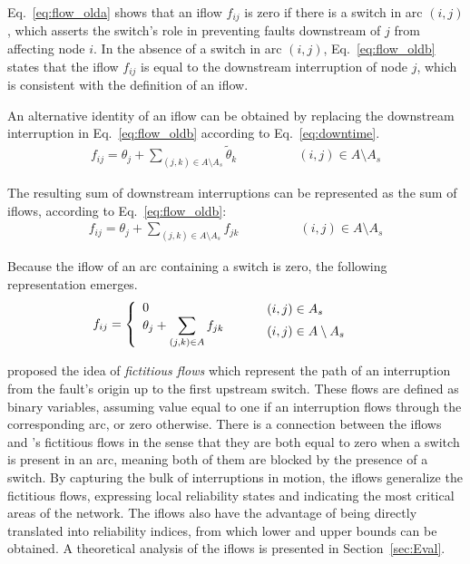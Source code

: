 Eq.~\eqref{eq:flow_olda} shows that an iflow $f_{ij}$ is zero if there is a switch in arc $(i,j)$, which asserts the switch's role in preventing faults downstream of $j$ from affecting node $i$. In the absence of a switch in arc $(i,j)$, Eq.~\eqref{eq:flow_oldb} states that the iflow $f_{ij}$ is equal to the downstream interruption of node $j$, which is consistent with the definition of an iflow.

An alternative identity of an iflow can be obtained by replacing the downstream interruption in Eq.~\eqref{eq:flow_oldb} according to Eq.~\eqref{eq:downtime}.
\begin{align*} 
\displaystyle
f_{ij} =
		\displaystyle \theta_{j} + \sum_{(j,k) \in A \setminus A_{s}}{\tilde{\theta}_{k}}  \qquad \qquad & (i,j) \in A \setminus A_{s} 
\end{align*}

The resulting sum of downstream interruptions can be represented as the sum of iflows, according to Eq.~\eqref{eq:flow_oldb}:
\begin{align*} 
\displaystyle
f_{ij} =
		\displaystyle \theta_{j} + \sum_{(j,k) \in A \setminus A_{s}}{f_{jk}}  \qquad \qquad & (i,j) \in A \setminus A_{s} 
\end{align*}

Because the iflow of an arc containing a switch is zero, the following representation emerges.
\begin{align} 
\displaystyle
f_{ij} =
	\left \{
		\begin{array}{l l}
			0 \\
			\displaystyle \theta_{j} + \sum_{(j,k) \in A}{f_{jk}}   \\
		\end{array}
	\right. \quad
	\left .
		\begin{array}{l l}
			& (i,j) \in A_s \vspace{0.2cm} \\
			& (i,j) \in A \setminus A_{s} \vspace{0.2cm} \\
		\end{array}
	\right.	\qquad	
\label{eq:flow}
\end{align}

\cite{LiEtAl2020b} proposed the idea of \textit{fictitious flows} which represent the path of an interruption from the fault's origin up to the first upstream switch. These flows are defined as binary variables, assuming value equal to one if an interruption flows through the corresponding arc, or zero otherwise. There is a connection between the iflows and \cite{LiEtAl2020b}'s fictitious flows in the sense that they are both equal to zero when a switch is present in an arc, meaning both of them are blocked by the presence of a switch. By capturing the bulk of interruptions in motion, the iflows generalize the fictitious flows, expressing local reliability states and indicating the most critical areas of the network. The iflows also have the advantage of being directly translated into reliability indices, from which lower and upper bounds can be obtained. A theoretical analysis of the iflows is presented in Section~\ref{sec:Eval}.

